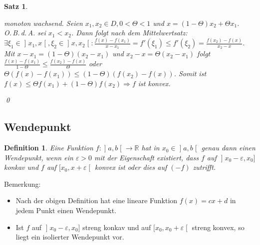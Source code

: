 \documentclass[ngerman,titlepage,twoside, parskip=half*]{scrreprt}
\newcommand*{\R}{\mathbb{R}}
\theoremstyle{break}
\newtheorem{theorem}{Satz}[section]
\newtheorem{definition}{Definition}[chapter]
\theoremstyle{nonumberbreak}
\newcommand*{\lsofint}[1]{\mathopen{]}#1]}   %
\newcommand*{\rsofint}[1]{[#1\mathclose{[}}  %
\newcommand*{\bsofint}[1]{\mathopen{]}#1\mathclose{[}} %
\begin{document}
\begin{theorem}
\begin{enumerate}[(i)]
\begin{itemize}
	  monoton wachsend. Seien $x_1,x_2\in D, 0<\Theta<1$ und 
	  $x=(1-\Theta)x_2+\Theta x_1$.\\
	  O.\,B.\,d.\,A. sei $x_1<x_2$. Dann folgt nach dem Mittelwertsatz:
	  $\exists\xi_1\in\bsofint{x_1,x}, \xi_2\in\bsofint{x,x_2}\colon
	  \frac{f(x)-f(x_1)}{x-x_1}=f'(\xi_1)\leq f'(\xi_2)=
	  \frac{f(x_2)-f(x)}{x_2-x}$. Mit $x-x_1=(1-\Theta)(x_2-x_1)$
	  und $x_2-x=\Theta(x_2-x_1)$ folgt $\frac{f(x)-f(x_1)}{1-\Theta}
	  \leq\frac{f(x_2)-f(x)}{\Theta}$ oder $\Theta(f(x)-f(x_1))\leq
	  (1-\Theta)(f(x_2)-f(x))$. Somit ist $f(x)\leq \Theta f(x_1)+
	  (1-\Theta)f(x_2)\Rightarrow f$ ist konvex.
      \end{itemize}
  \end{enumerate}
  \qed
\end{theorem}

\subsection{Wendepunkt}
\begin{definition}
  Eine Funktion $f\colon\bsofint{a,b}\rightarrow\R$ hat in $x_0\in\bsofint{a,b}$ genau dann
  einen \emph{Wendepunkt}, wenn ein $\varepsilon>0$
  mit der Eigenschaft existiert, dass $f$ auf $\lsofint{x_0-\varepsilon,x_0}$
  konkav und $f$ auf $\rsofint{x_0,x+\varepsilon}$ konvex ist oder dies auf
  $(-f)$ zutrifft.
\end{definition}

Bemerkung:
\begin{itemize}
  \item Nach der obigen Definition hat eine lineare Funktion
    $f(x)=cx+d$  in jedem Punkt einen Wendepunkt.
  \item Ist $f$ auf $\lsofint{x_0-\varepsilon,x_0}$ streng konkav und auf
    $\rsofint{x_0,x_0+\varepsilon}$ streng konvex, so liegt ein isolierter
    Wendepunkt vor.
\end{itemize}
\end{document}
